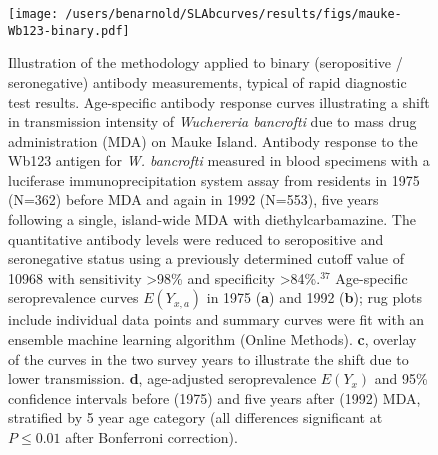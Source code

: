 \documentclass[11pt]{article}
\begin{document}
\clearpage
\begin{figure}[htbp]
\begin{center}
\texttt{[image: /users/benarnold/SLAbcurves/results/figs/mauke-Wb123-binary.pdf]}
\begin{minipage}{\textwidth}
\caption{Illustration of the methodology applied to binary (seropositive / seronegative) antibody measurements, typical of rapid diagnostic test results. Age-specific antibody response curves illustrating a shift in transmission intensity of \textit{Wuchereria bancrofti} due to mass drug administration (MDA) on Mauke Island.  Antibody response to the Wb123 antigen for \textit{W. bancrofti} measured in blood specimens with a luciferase immunoprecipitation system assay from residents in 1975 (N=362) before MDA and again in 1992 (N=553), five years following a single, island-wide MDA with diethylcarbamazine. The quantitative antibody levels were reduced to seropositive and seronegative status using a previously determined cutoff value of 10968 with sensitivity >98\% and specificity >84\%.$^{37}$ Age-specific seroprevalence curves $E(Y_{x,a})$ in 1975 (\textbf{a}) and 1992 (\textbf{b}); rug plots include individual data points and summary curves were fit with an ensemble machine learning algorithm (Online Methods). \textbf{c}, overlay of the curves in the two survey years to illustrate the shift due to lower transmission.  \textbf{d}, age-adjusted seroprevalence $E(Y_{x})$ and 95\% confidence intervals before (1975) and five years after (1992) MDA, stratified by 5 year age category (all differences significant at $P\leq0.01$ after Bonferroni correction).}
\label{fig:maukebina}
\end{minipage}
\end{center}
\end{figure}
\end{document}
